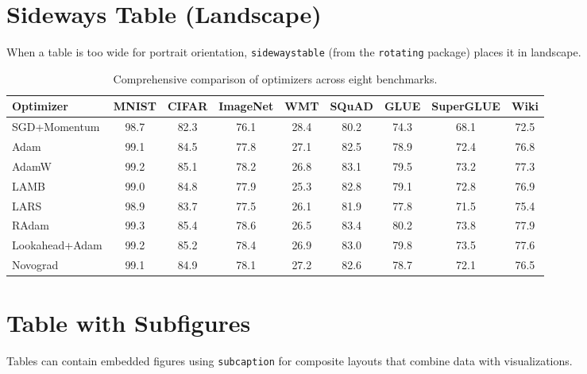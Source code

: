 \documentclass[
    language=english,
    doctype=article,
    institution=none,
]{../../omnilatex}
\begin{document}
\section{Sideways Table (Landscape)}
\label{sec:sidewaystable}

When a table is too wide for portrait orientation, \texttt{sidewaystable} (from
the \texttt{rotating} package) places it in landscape.

\begin{table}
    \centering
    \caption{Comprehensive comparison of optimizers across eight benchmarks.}
    \label{tab:sideways}
    \begin{tabular}{l *{8}{S[table-format=2.1]}}
        \toprule
        \textbf{Optimizer} & {MNIST} & {CIFAR} & {ImageNet} & {WMT} & {SQuAD} & {GLUE} & {SuperGLUE} & {Wiki} \\
        \midrule
        SGD+Momentum      & 98.7 & 82.3 & 76.1 & 28.4 & 80.2 & 74.3 & 68.1 & 72.5 \\
        Adam              & 99.1 & 84.5 & 77.8 & 27.1 & 82.5 & 78.9 & 72.4 & 76.8 \\
        AdamW             & 99.2 & 85.1 & 78.2 & 26.8 & 83.1 & 79.5 & 73.2 & 77.3 \\
        LAMB              & 99.0 & 84.8 & 77.9 & 25.3 & 82.8 & 79.1 & 72.8 & 76.9 \\
        LARS              & 98.9 & 83.7 & 77.5 & 26.1 & 81.9 & 77.8 & 71.5 & 75.4 \\
        RAdam             & 99.3 & 85.4 & 78.6 & 26.5 & 83.4 & 80.2 & 73.8 & 77.9 \\
        Lookahead+Adam    & 99.2 & 85.2 & 78.4 & 26.9 & 83.0 & 79.8 & 73.5 & 77.6 \\
        Novograd          & 99.1 & 84.9 & 78.1 & 27.2 & 82.6 & 78.7 & 72.1 & 76.5 \\
        \bottomrule
    \end{tabular}
\end{table}

\section{Table with Subfigures}
\label{sec:table-subfigures}

Tables can contain embedded figures using \texttt{subcaption} for composite layouts
that combine data with visualizations.
\end{document}
